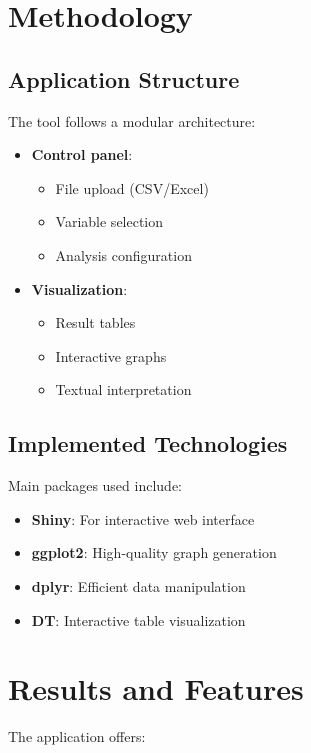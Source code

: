 \documentclass[12pt]{article}
\begin{document}
\section{Methodology}
\subsection{Application Structure}
The tool follows a modular architecture:

\begin{itemize}
    \item \textbf{Control panel}:
    \begin{itemize}
        \item File upload (CSV/Excel)
        \item Variable selection
        \item Analysis configuration
    \end{itemize}
    \item \textbf{Visualization}:
    \begin{itemize}
        \item Result tables
        \item Interactive graphs
        \item Textual interpretation
    \end{itemize}
\end{itemize}

\subsection{Implemented Technologies}
Main packages used include:

\begin{itemize}
    \item \textbf{Shiny}: For interactive web interface
    \item \textbf{ggplot2}: High-quality graph generation
    \item \textbf{dplyr}: Efficient data manipulation
    \item \textbf{DT}: Interactive table visualization
\end{itemize}

\section{Results and Features}
The application offers:
\end{document}
